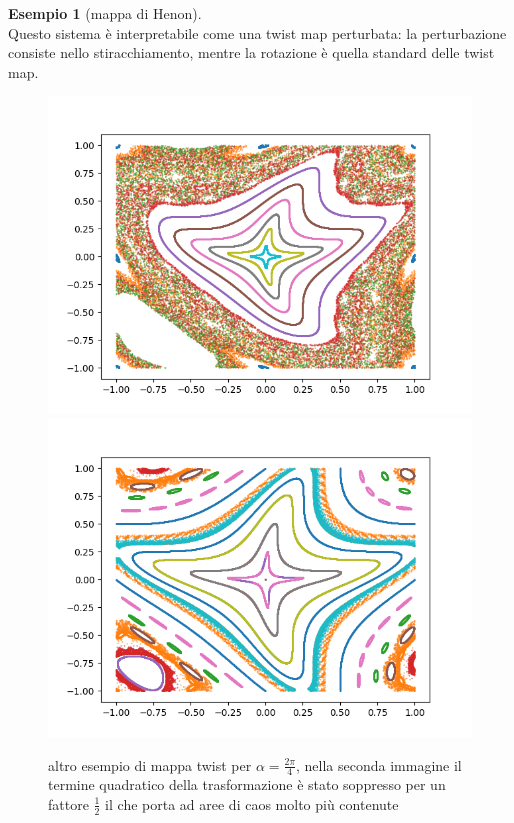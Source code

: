 \documentclass[a4paper,12pt]{article}
\theoremstyle{plain}
\theoremstyle{definition}
\newtheorem{exmp}{Esempio}[section]
\newcommand{\f}[2]{\frac{#1}{#2}}
\theoremstyle{remark}
\begin{document}
\begin{exmp}[mappa di Henon]
\\Questo sistema è interpretabile come una twist map perturbata: la perturbazione consiste nello stiracchiamento, mentre la rotazione è quella standard delle twist map.
\begin{figure}[h]
	\centering
\includegraphics[scale=0.5]{attack2}\includegraphics[scale=0.5]{attack3}
\caption{altro esempio di mappa twist per $\alpha=\f{2\pi}{4}$, nella seconda immagine il termine quadratico della trasformazione è stato soppresso per un fattore $\f{1}{2}$ il che porta ad aree di caos molto più contenute}
\end{figure}
\label{Henon2}

\end{exmp}
\end{document}
